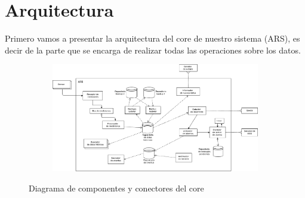 \section{Arquitectura}
\par Primero vamos a presentar la arquitectura del core de nuestro sistema (ARS), es decir de la parte que se encarga de realizar todas las operaciones sobre los datos.

\begin{figure}[h]
  \hspace*{-0.7cm}
  \begin{subfigure}{1.1\textwidth}
    \includegraphics[width=\textwidth]{imagenes/diagramas/core.png}
  \end{subfigure}
  \label{}
  \caption{Diagrama de componentes y conectores del core}
\end{figure}

